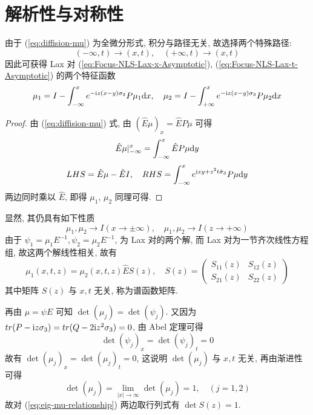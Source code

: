 \section{解析性与对称性}\label{sec:analytic-symmetry}
由于 (\ref{eq:diffision-mu}) 为全微分形式, 积分与路径无关, 故选择两个特殊路径: 
\begin{equation*}
  (- \infty, t) \to(x,t) , \quad (+ \infty, t) \to(x,t)
\end{equation*}
因此可获得 Lax 对 (\ref{eq:Focus-NLS-Lax-x-Asymptotic}), (\ref{eq:Focus-NLS-Lax-t-Asymptotic}) 的两个特征函数 
\begin{equation}
  \mu_{1} = I - \int^{x}_{-\infty} e^{- \mathrm{i} z (x - y) \sigma_{3}} P \mu_{1}\mathrm{d} x, \quad \mu_{2} = I - \int^{x}_{+\infty} e^{- \mathrm{i} z (x - y) \sigma_{3}} P \mu_{2}\mathrm{d} x \label{eq:integral-mu}
\end{equation}
\begin{proof}
  由 (\ref{eq:diffision-mu}) 式, 由 $ (\hat{E} \mu)_{x} = \hat{E} P \mu $ 可得
  \begin{equation}
    \hat{E} \mu |_{-\infty}^{x} = \int_{-\infty}^{x} \hat{E} P \mu \mathrm{d} y
  \end{equation}
  \begin{equation*}
      LHS = \hat{E} \mu - \hat{E} I , \quad
      RHS = \int_{-\infty}^{x} e^{ \mathrm{i} zy + z^2 t \hat{\sigma}_{3}} P \mu \mathrm{d} y 
  \end{equation*}两边同时乘以 $ \hat{E} $, 即得 $ \mu_{1} $, $ \mu_{2} $ 同理可得. 
\end{proof}

显然, 其仍具有如下性质
\begin{equation}
  \mu_{1}, \mu_{2} \to I (x \to \pm \infty), \quad  \mu_{1}, \mu_{2} \to I (z \to + \infty)
\end{equation}
由于 $ \psi_{1} = \mu_{1} E^{-1}, \psi_{2} = \mu_{2} E^{-1} $, 为 Lax 对的两个解, 而 Lax 对为一节齐次线性方程组, 故这两个解线性相关, 故有
\begin{equation}
  \mu_{1}(x,t,z) = \mu_{2}(x,t,z) \hat{E} S(z), \label{eq:eig-mu-relationship} \quad 
  S(z) = 
  \begin{pmatrix}
    S_{11}(z) & S_{12}(z) \\ S_{21}(z) & S_{22}(z)
  \end{pmatrix}
\end{equation}
其中矩阵 $ S(z) $ 与 $ x,t $ 无关, 称为谱函数矩阵. 

再由 $ \mu = \psi E $ 可知 $ \det(\mu_{j}) = \det(\psi_{j}) $. 又因为 $ tr(P - \mathrm{i} z \sigma_{3}) = tr(Q - 2 \mathrm{i} z^2 \sigma_{3}) = 0 $, 由 Abel 定理可得
\begin{equation}
  \det(\psi_{j})_{x} = \det(\psi_{j})_{t} = 0
\end{equation}
故有 $ \det(\mu_{j})_x = \det(\mu_{j})_{t} = 0 $, 这说明 $ \det(\mu_{j}) $ 与 $ x,t $ 无关, 再由渐进性可得
\begin{equation}
  \det(\mu_{j}) = \lim_{|x| \to \infty} \det(\mu_{j}) = 1, \quad(j = 1,2) \label{eq:mu-det}
\end{equation}
故对 (\ref{eq:eig-mu-relationship}) 两边取行列式有 $ \det S(z) = 1 $. 

